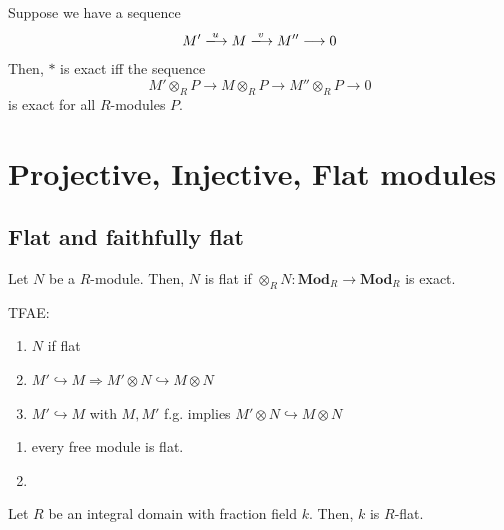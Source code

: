 \documentclass[oneside, 12pt]{scrbook}
\theoremstyle{theorem}
\begin{document}
\begin{theorem}
Suppose we have a sequence 
\begin{equation}[*]
M' \xlongrightarrow{u} M \xlongrightarrow{v} M'' \longrightarrow 0
\end{equation}
Then, $*$ is exact iff the sequence 
\begin{equation}[*]
M' \otimes_{R} P \longrightarrow M \otimes_{R} P \longrightarrow M'' \otimes_{R} P \longrightarrow 0
\end{equation}
is exact for all $R$-modules $P$.
\end{theorem}

\chapter{Projective, Injective, Flat modules}

\section{Flat and faithfully flat}

\begin{definition}
Let $N$ be a $R$-module. Then, $N$ is flat if $\otimes_{R} N : \mathbf{Mod}_{R} \rightarrow \mathbf{Mod}_{R}$ is exact.
\end{definition}

\begin{lemma}
TFAE: 
\begin{enumerate}
\item $N$ if flat 
\item $M' \hookrightarrow M \Rightarrow M' \otimes N \hookrightarrow M \otimes N$
\item $M' \hookrightarrow M $ with $M,M'$ f.g. implies $M'\otimes N \hookrightarrow M \otimes N$
\end{enumerate}
\end{lemma}

\begin{example}
\begin{enumerate}
\item every free module is flat.
\item 
\end{enumerate}
\end{example}

\begin{exercise}
Let $R$ be an integral domain with fraction field $k$. Then, $k$ is $R$-flat.
\end{exercise}
\end{document}
